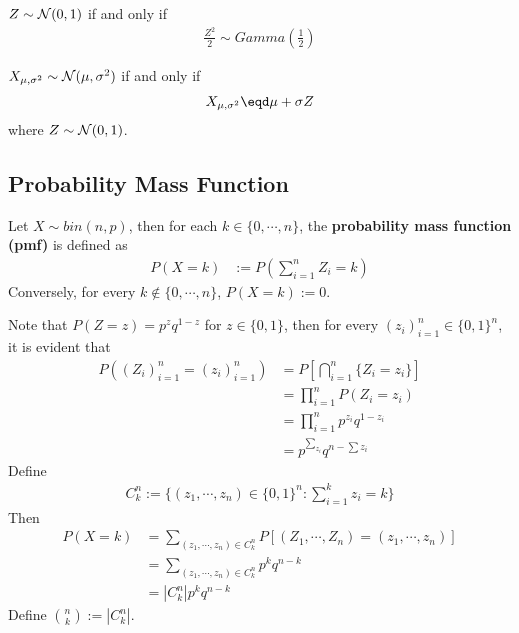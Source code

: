 \documentclass{article}
\begin{document}
 	\begin{definition}[Definition 2]
 		$Z \sim \mathcal{{N}}(0, 1)$ if and only if
 		\begin{align}
 			\frac{Z^2}{2} \sim Gamma\left(\frac{1}{2}\right)
 		\end{align}
 	\end{definition}
 	
 	\begin{definition}
 		$X_{\mu, \sigma^2} \sim \mathcal{{N}}(\mu, \sigma^2)$ if and only if
 		\begin{align}
 			X_{\mu, \sigma^2} \eqd \mu + \sigma Z
 		\end{align}
 		where $Z \sim \mathcal{{N}}(0, 1)$.
 	\end{definition}
 	
    \subsection{Probability Mass Function}
   	\begin{definition}
   		Let $X \sim bin(n, p)$, then for each $k \in \{0, \cdots, n\}$, the \textbf{probability mass function (pmf)} is defined as
   		\begin{align}
   			P(X = k) &:= P(\sum_{i=1}^n Z_i = k)
   		\end{align}
   		Conversely, for every $k \notin \{0, \cdots, n\}$, $P(X=k) := 0$.
   	\end{definition}
   	
   	\begin{theorem}
   		Note that $P(Z=z) = p^z q^{1-z}$ for $z \in \{0, 1\}$, then for every $(z_i)_{i=1}^n \in \{0, 1\}^n$, it is evident that
   		\begin{align}
   			P((Z_i)_{i=1}^n = (z_i)_{i=1}^n) &= P \left[\bigcap_{i=1}^n\{Z_i = z_i\}\right] \\
   			&= \prod_{i=1}^n P(Z_i = z_i) \\
   			&= \prod_{i=1}^n p^{z_i} q^{1-z_i} \\
   			&= p^{\sum_{z_i}} q^{n - \sum z_i}
   		\end{align}
   		Define
   		\begin{align}
   			C_k^n := \{(z_1, \cdots, z_n) \in \{0, 1\}^n: \sum_{i=1}^k z_i = k\}
   		\end{align}
   		Then 
   		\begin{align}
   			P(X = k) &= \sum_{(z_1, \cdots, z_n) \in C_k^n} P[(Z_1, \cdots, Z_n) = (z_1, \cdots, z_n)] \\
   			&= \sum_{(z_1, \cdots, z_n) \in C_k^n} p^k q^{n-k} \\
   			&= |C_k^n| p^k q^{n-k}
   		\end{align}
   		Define $\binom{n}{k} := |C_k^n|$.
   	\end{theorem}
   	
\end{document}
